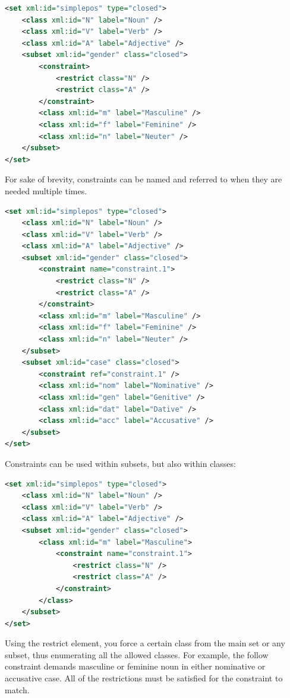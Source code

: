 \documentclass[a4paper,12pt]{report}
\begin{document}
\begin{lstlisting}[language=xml]
<set xml:id="simplepos" type="closed">
    <class xml:id="N" label="Noun" />
    <class xml:id="V" label="Verb" />
    <class xml:id="A" label="Adjective" />   
    <subset xml:id="gender" class="closed">
        <constraint>
            <restrict class="N" />
            <restrict class="A" />
        </constraint>
        <class xml:id="m" label="Masculine" />    
        <class xml:id="f" label="Feminine" />
        <class xml:id="n" label="Neuter" />
    </subset>
</set>
\end{lstlisting}

For sake of brevity, constraints can be named and referred to when they are needed multiple times.

\begin{lstlisting}[language=xml]
<set xml:id="simplepos" type="closed">
    <class xml:id="N" label="Noun" />
    <class xml:id="V" label="Verb" />
    <class xml:id="A" label="Adjective" />   
    <subset xml:id="gender" class="closed">
        <constraint name="constraint.1">
            <restrict class="N" />
            <restrict class="A" />
        </constraint>
        <class xml:id="m" label="Masculine" />    
        <class xml:id="f" label="Feminine" />
        <class xml:id="n" label="Neuter" />
    </subset>
    <subset xml:id="case" class="closed">
        <constraint ref="constraint.1" />
        <class xml:id="nom" label="Nominative" />    
        <class xml:id="gen" label="Genitive" />
        <class xml:id="dat" label="Dative" />
        <class xml:id="acc" label="Accusative" />
    </subset>
</set>
\end{lstlisting}

Constraints can be used within subsets, but also within classes:

\begin{lstlisting}[language=xml]
<set xml:id="simplepos" type="closed">
    <class xml:id="N" label="Noun" />
    <class xml:id="V" label="Verb" />
    <class xml:id="A" label="Adjective" />   
    <subset xml:id="gender" class="closed">
        <class xml:id="m" label="Masculine">
            <constraint name="constraint.1">
                <restrict class="N" />
                <restrict class="A" />
            </constraint>
        </class>    
    </subset>
</set>
\end{lstlisting}

Using the restrict element, you force a certain class from the main set or any subset, thus enumerating all the allowed classes. For example, the follow constraint demands masculine or feminine noun in either nominative or accusative case. All of the restrictions must be satisfied for the constraint to match.
\end{document}
